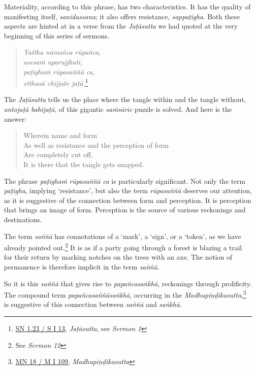 Materiality, according to this phrase, has two characteristics. It has the quality of manifesting itself, \emph{sanidassana}; it also offers resistance, \emph{sappaṭigha}. Both these aspects are hinted at in a verse from the \emph{Jaṭāsutta} we had quoted at the very beginning of this series of sermons.

\begin{quote}
\emph{Yattha nāmañca rūpañca,}\\
\emph{asesaṁ uparujjhati,}\\
\emph{paṭighaṁ rūpasaññā ca,}\\
\emph{etthasā chijjate jaṭā.}\footnote{\href{https://suttacentral.net/sn1.23/pli/ms}{SN 1.23 / S I 13}, \emph{Jaṭāsutta}, see \emph{Sermon 1}}
\end{quote}

\clearpage

The \emph{Jaṭāsutta} tells us the place where the tangle within and the tangle without, \emph{antojaṭā bahijaṭā}, of this gigantic \emph{saṁsāric} puzzle is solved. And here is the answer:

\begin{quote}
Wherein name and form\\
As well as resistance and the perception of form\\
Are completely cut off,\\
It is there that the tangle gets snapped.
\end{quote}

The phrase \emph{paṭighaṁ rūpasaññā ca} is particularly significant. Not only the term \emph{paṭigha}, implying `resistance', but also the term \emph{rūpasaññā} deserves our attention, as it is suggestive of the connection between form and perception. It is perception that brings an image of form. Perception is the source of various reckonings and destinations.

The term \emph{saññā} has connotations of a `mark', a `sign', or a `token', as we have already pointed out.\footnote{See \emph{Sermon 12}} It is as if a party going through a forest is blazing a trail for their return by marking notches on the trees with an axe. The notion of permanence is therefore implicit in the term \emph{saññā}.

So it is this \emph{saññā} that gives rise to \emph{papañcasaṅkhā}, reckonings through prolificity. The compound term \emph{papañcasaññāsaṅkhā}, occurring in the \emph{Madhupiṇḍikasutta},\footnote{\href{https://suttacentral.net/mn18/pli/ms}{MN 18 / M I 109}, \emph{Madhupiṇḍikasutta}} is suggestive of this connection between \emph{saññā} and \emph{saṅkhā}.

